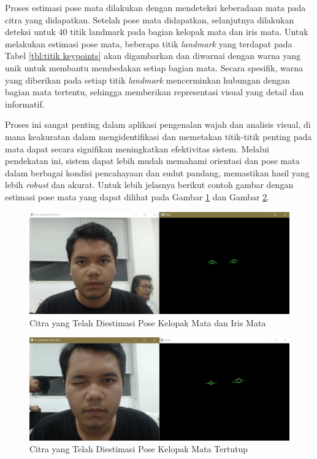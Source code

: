 Proses estimasi pose mata dilakukan dengan mendeteksi keberadaan mata pada citra yang didapatkan. Setelah pose mata didapatkan, selanjutnya dilakukan deteksi untuk 40 titik landmark pada bagian kelopak mata dan iris mata. Untuk melakukan estimasi pose mata, beberapa titik \emph{landmark} yang terdapat pada Tabel \ref{tbl:titik keypoints} akan digambarkan dan diwarnai dengan warna yang unik untuk membantu membedakan setiap bagian mata. Secara spesifik, warna yang diberikan pada setiap titik \emph{landmark} mencerminkan hubungan dengan bagian mata tertentu, sehingga memberikan representasi visual yang detail dan informatif.

Proses ini sangat penting dalam aplikasi pengenalan wajah dan analisis visual, di mana keakuratan dalam mengidentifikasi dan memetakan titik-titik penting pada mata dapat secara signifikan meningkatkan efektivitas sistem. Melalui pendekatan ini, sistem dapat lebih mudah memahami orientasi dan pose mata dalam berbagai kondisi pencahayaan dan sudut pandang, memastikan hasil yang lebih \emph{robust} dan akurat. Untuk lebih jelasnya berikut contoh gambar dengan estimasi pose mata yang dapat dilihat pada Gambar \ref{fig:contoh citra yang telah diestimasi pose} dan Gambar \ref{fig:citratertutup}. 

\begin{figure} [ht] \centering
    \includegraphics[scale=0.35]{gambar/bab3/iris.png}
    \caption{Citra yang Telah Diestimasi Pose Kelopak Mata dan Iris Mata}
    \label{fig:contoh citra yang telah diestimasi pose}
\end{figure}

\begin{figure} [ht] \centering
  \includegraphics[scale=0.35]{gambar/bab3/stop.png}
  \caption{Citra yang Telah Diestimasi Pose Kelopak Mata Tertutup}
  \label{fig:citratertutup}
\end{figure}

